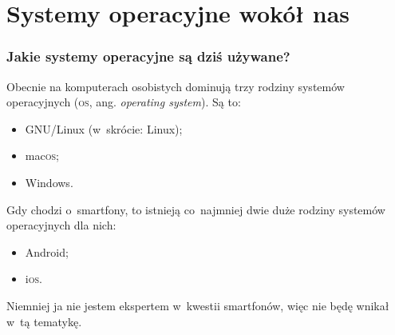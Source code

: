 \documentclass[10pt,t]{beamer}
\begin{document}
\section{Systemy operacyjne wokół nas}


\begin{frame}
  \frametitle{Jakie systemy operacyjne są dziś używane?}


  Obecnie na komputerach osobistych dominują trzy rodziny systemów
  operacyjnych (\textsc{os}, ang. \textit{operating system}). Są to:
  \begin{itemize}

  \item GNU/Linux (w~skrócie: Linux);

  \item mac\textsc{os};

  \item Windows.

  \end{itemize}

  Gdy chodzi o~smartfony, to istnieją co~najmniej dwie duże rodziny systemów
  operacyjnych dla nich:
  \begin{itemize}

  \item Android;

  \item i\textsc{os}.

  \end{itemize}
  Niemniej ja nie jestem ekspertem w~kwestii smartfonów, więc nie będę
  wnikał w~tą tematykę.

\end{frame}
\end{document}

